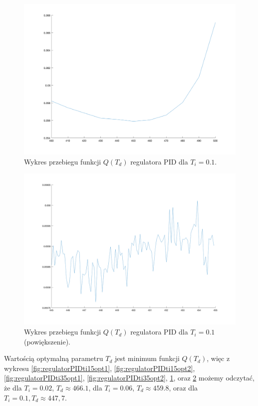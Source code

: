 \documentclass[a4paper,10pt]{article}
\begin{document}
\begin{figure}[!h]
    \centering
	\includegraphics[width=130mm]{PID-opt-ti-1.png}
	\caption{Wykres przebiegu funkcji $Q(T_{d})$ regulatora PID dla $T_{i}=0.1$.}
    \label{fig:regulatorPIDti100opt1}
\end{figure}
\begin{figure}[!h]
    \centering
	\includegraphics[width=130mm]{PID-opt-ti-1-zoom.png}
	\caption{Wykres przebiegu funkcji $Q(T_{d})$ regulatora PID dla $T_{i}=0.1$ (powiększenie).}
    \label{fig:regulatorPIDti100opt2}
\end{figure}
\newpage Wartością optymalną parametru $T_{d}$ jest minimum funkcji $Q(T_{d})$, więc z wykresu \ref{fig:regulatorPIDti15opt1}, \ref{fig:regulatorPIDti15opt2}, \ref{fig:regulatorPIDti35opt1}, \ref{fig:regulatorPIDti35opt2}, \ref{fig:regulatorPIDti100opt1}, oraz \ref{fig:regulatorPIDti100opt2} możemy odczytać, że dla $T_{i}=0.02$, $T_{d} \approx  466.1$, dla $T_{i}=0.06$, $T_{d} \approx 459.8$, oraz dla $T_{i}=0.1, T_{d} \approx 447,7$.
\end{document}
